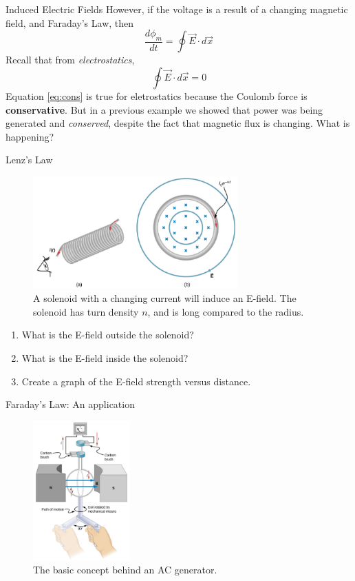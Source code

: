 \documentclass{beamer}
\begin{document}
\begin{frame}{Induced Electric Fields}
However, if the voltage is a result of a changing magnetic field, and Faraday's Law, then
\begin{equation}
\frac{d\phi_m}{dt} = \oint \vec{E} \cdot d\vec{x}
\end{equation}
Recall that from \textit{electrostatics},
\begin{equation}
\oint \vec{E} \cdot d\vec{x} = 0 \label{eq:cons}
\end{equation}
Equation \ref{eq:cons} is true for eletrostatics because the Coulomb force is \textbf{conservative}.  But in a previous example we showed that power was being generated and \textit{conserved}, despite the fact that magnetic flux is changing.  What is happening?
\end{frame}

\begin{frame}{Lenz's Law}
\small
\begin{figure}
\centering
\includegraphics[width=0.7\textwidth]{figures/loop3.png}
\caption{\label{fig:loop5} A solenoid with a changing current will induce an E-field.  The solenoid has turn density $n$, and is long compared to the radius.}
\end{figure}
\begin{enumerate}
\item What is the E-field outside the solenoid?
\item What is the E-field inside the solenoid?
\item Create a graph of the E-field strength versus distance.
\end{enumerate}
\end{frame}

\begin{frame}{Faraday's Law: An application}
\small
\begin{figure}
\centering
\includegraphics[width=0.33\textwidth]{figures/gen1.png}
\caption{\label{fig:gen1} The basic concept behind an AC generator.}
\end{figure}
\end{frame}
\end{document}
